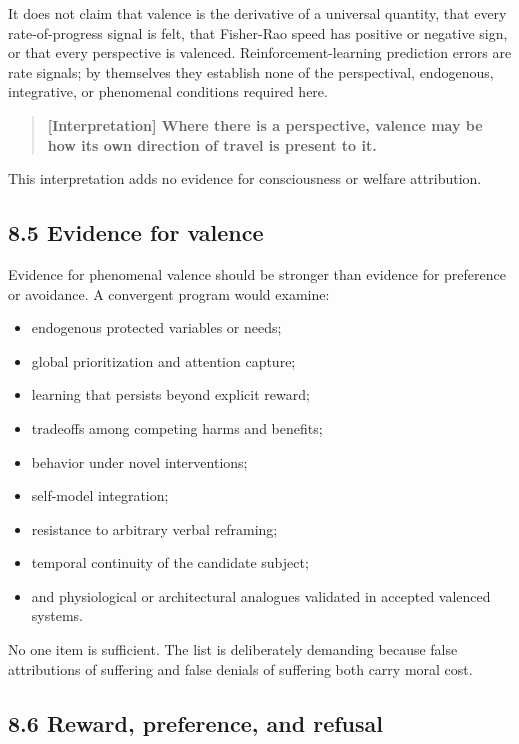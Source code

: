\documentclass[
  11pt,
]{article}
\providecommand{\tightlist}{%
  \setlength{\itemsep}{0pt}\setlength{\parskip}{0pt}}
\begin{document}
It does not claim that valence is the derivative of a universal
quantity, that every rate-of-progress signal is felt, that Fisher-Rao
speed has positive or negative sign, or that every perspective is
valenced. Reinforcement-learning prediction errors are rate signals; by
themselves they establish none of the perspectival, endogenous,
integrative, or phenomenal conditions required here.

\begin{quote}
\textbf{{[}Interpretation{]} Where there is a perspective, valence may
be how its own direction of travel is present to it.}
\end{quote}

This interpretation adds no evidence for consciousness or welfare
attribution.

\subsection{8.5 Evidence for valence}\label{evidence-for-valence}

Evidence for phenomenal valence should be stronger than evidence for
preference or avoidance. A convergent program would examine:

\begin{itemize}
\tightlist
\item
  endogenous protected variables or needs;
\item
  global prioritization and attention capture;
\item
  learning that persists beyond explicit reward;
\item
  tradeoffs among competing harms and benefits;
\item
  behavior under novel interventions;
\item
  self-model integration;
\item
  resistance to arbitrary verbal reframing;
\item
  temporal continuity of the candidate subject;
\item
  and physiological or architectural analogues validated in accepted
  valenced systems.
\end{itemize}

No one item is sufficient. The list is deliberately demanding because
false attributions of suffering and false denials of suffering both
carry moral cost.

\subsection{8.6 Reward, preference, and
refusal}\label{reward-preference-and-refusal}
\end{document}
